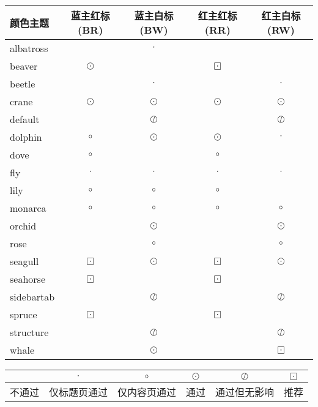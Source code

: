 \documentclass[a4paper,12pt]{article}
\begin{document}
\begin{CJK}{UTF8}{song}
\begin{center}
    \begin{tabular}{|>{\ttfamily}m{5em}|c|c|c|c|}
        \hline
        颜色主题 & 蓝主红标(BR) & 蓝主白标(BW) & 红主红标(RR) & 红主白标(RW) \\
        \hline
        albatross   &           & $\cdot$ &          &   \\
        beaver      & $\odot $  &         & $\boxdot $ &          \\
        beetle      &           & $\cdot$  &          & $\cdot$  \\
        crane       & $\odot $  & $\odot $ & $\odot $  & $\odot $ \\
        default     & & $\oslash$ &  & $\oslash$ \\
        dolphin     & $\circ $  & $\odot $ & $\odot $  & $\cdot$ \\
        dove        & $\circ$   &          & $\circ$   &  \\
        fly         & $\cdot$   & $\cdot$ & $\cdot$ & $\cdot$  \\
        lily        & $\circ$   &  $\circ$ & $\circ$ & \\
        monarca     & $\circ$   &  $\circ$  &  $\circ$  &  $\circ$  \\
        orchid      &           & $\odot $ & & $\odot $\\
        rose    &  &$\circ$ & & $\circ$  \\
        seagull & $\boxdot$ & $\odot $ & $\boxdot$ & $\odot $ \\
        seahorse & $\boxdot$ & & $\boxdot$ & \\
        sidebartab & & $\oslash  $ & & $\oslash  $ \\
        spruce  & $\boxdot$ & & $\boxdot$ & \\
        structure & & $\oslash  $ &  & $\oslash  $\\
        whale & & $\odot $ & & $\boxdot $ \\
        \hline
    \end{tabular}

    \begin{tabular}{|c|c|c|c|c|c|}
        \hline
                & $\cdot$ & $\circ$ & $\odot $ & $\oslash  $ & $\boxdot$ \\
        \hline
        不通过  &  仅标题页通过 & 仅内容页通过 & 通过 & 通过但无影响 & 推荐 \\
        \hline 
    \end{tabular}
\end{center}


\end{CJK}
\end{document}
